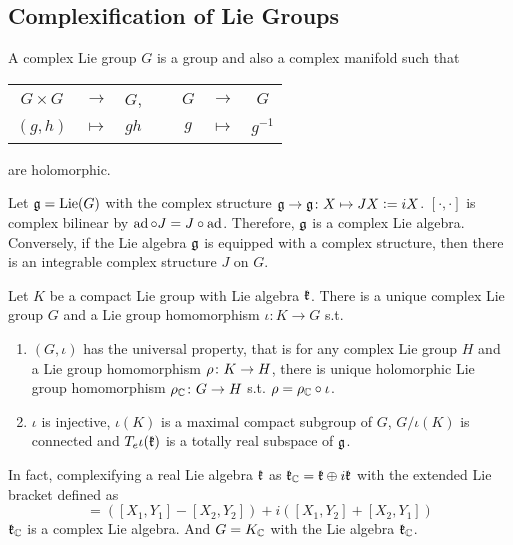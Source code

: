 \documentclass[a4paper,12pt]{article}
\begin{document}
	\subsection{Complexification of Lie Groups}

	\begin{defn}
		A complex Lie group $G$ is a group and also a complex manifold such that 
		\begin{center}
			\begin{tabular}{ccccccc}
				$G \times G$ & $\rightarrow$ & $G$,&~& $G$ & $\rightarrow$ & $G$\\
				$(g,h)$ & $\mapsto$ & $gh$ & ~&$g$& $\mapsto$ & $g^{-1}$
			\end{tabular}
		\end{center}
		are holomorphic.
	\end{defn}
	\begin{rem}
		Let $\mathfrak{g} = \operatorname{Lie}(G)$ with the complex structure $\mathfrak{g} \rightarrow \mathfrak{g} \colon X \mapsto JX \vcentcolon= iX$. $[\cdot,\cdot]$ is complex bilinear by $\operatorname{ad} \circ J = J \circ \operatorname{ad}$. Therefore, $\mathfrak{g}$ is a complex Lie algebra. Conversely, if the Lie algebra $\mathfrak{g}$ is equipped with a complex structure, then there is an integrable complex structure $J$ on $G$.
	\end{rem}

	\begin{thm}
		Let $K$ be a compact Lie group with Lie algebra $\mathfrak{k}$. There is a unique complex Lie group $G$ and a Lie group homomorphism $\iota \colon K \to G$ s.t. 
		\begin{enumerate}
			\item $(G,\iota)$ has the universal property, that is for any complex Lie group $H$ and a Lie group homomorphism $\rho \colon K \rightarrow H$, there is unique holomorphic Lie group homomorphism $\rho_{\mathbb{C}} \colon G \rightarrow H$ s.t. $\rho = \rho_{\mathbb{C}}  \circ \iota$.
			\item $\iota$ is injective, $\iota(K)$ is a maximal compact subgroup of $G$,  $G/\iota(K)$ is connected and $T_e\iota(\mathfrak{k})$ is a totally real subspace of $\mathfrak{g}$.
		\end{enumerate}
	\end{thm}
	\begin{rem}
		In fact, complexifying a real Lie algebra $\mathfrak{k}$ as $\mathfrak{k}_{\mathbb{C}} = \mathfrak{k} \oplus i\mathfrak{k}$ with the extended Lie bracket defined as
		\begin{equation*}
			[X_1+iX_2, Y_1+iY_2] = ([X_1,Y_1] - [X_2,Y_2]) + i ([X_1,Y_2] + [X_2,Y_1])
		\end{equation*}
		$\mathfrak{k}_{\mathbb{C}}$ is a complex Lie algebra. And $G = K_{\mathbb{C}}$ with the Lie algebra $\mathfrak{k}_{\mathbb{C}}$.
	\end{rem}
	
\end{document}
